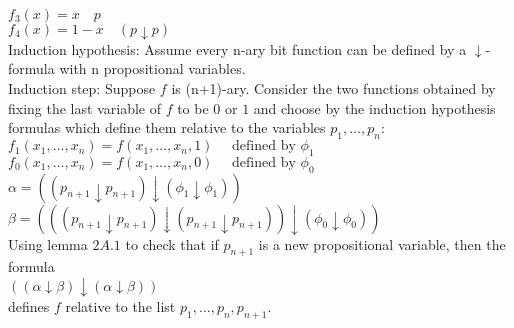 \documentclass[10pt]{article}
\begin{document}
$f_3(x)=x\quad p$\\
$f_4(x)=1-x\quad (p\downarrow p)$\\
Induction hypothesis: Assume every n-ary bit function can be defined by a $\downarrow$-formula with n propositional variables.\\
Induction step: Suppose $f$ is (n+1)-ary. 
Consider the two functions obtained by fixing the last variable of $f$ to be $0$ or $1$ and choose by the induction hypothesis formulas which define them relative to the variables $p_1,\ldots,p_n$:\\
$f_1(x_1,\ldots,x_n)=f(x_1,\ldots,x_n,1)\quad\text{ defined by }\phi_1$\\
$f_0(x_1,\ldots,x_n)=f(x_1,\ldots,x_n,0)\quad\text{ defined by }\phi_0$\\
$\alpha=((p_{n+1}\downarrow p_{n+1})\downarrow(\phi_1\downarrow\phi_1))$\\
$\beta=(((p_{n+1}\downarrow p_{n+1})\downarrow(p_{n+1}\downarrow p_{n+1}))\downarrow(\phi_0\downarrow\phi_0))$\\
Using lemma $2A.1$ to check that if $p_{n+1}$ is a new propositional variable, then the formula\\
$((\alpha\downarrow\beta)\downarrow(\alpha\downarrow\beta))$\\
defines $f$ relative to the list $p_1,\ldots,p_n,p_{n+1}$.
\end{document}
